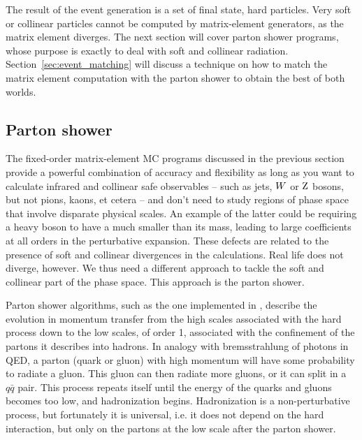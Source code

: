 The result of the event generation is a set of final state, hard particles. Very
soft or collinear particles cannot be computed by matrix-element generators, as the matrix element
diverges. The next section will cover parton shower programs, whose purpose is exactly to deal with
soft and collinear radiation. Section~\ref{sec:event_matching} will discuss a technique on how to
match the matrix element computation with the parton shower to obtain the best of both worlds. 



\subsection{Parton shower}

The fixed-order matrix-element MC programs discussed in the previous section provide a powerful
combination of accuracy and flexibility as long as you want to calculate infrared and collinear safe
observables -- such as jets, $W$ or $\mathrm{Z}$ bosons, but not pions, kaons, et cetera -- and
don’t need to study regions of phase space that involve disparate physical scales. An example of
the latter could be requiring a heavy boson to have a \pt much smaller than its mass, leading to
large coefficients at all orders in the perturbative expansion.
These defects are related to the presence of soft and collinear divergences in the calculations.
Real life does not diverge, however. We thus need a different approach to tackle the soft and
collinear part of the phase space. This approach is the parton shower. 

Parton shower algorithms, such as the one implemented in \PYTHIA, describe the evolution in
momentum transfer from the high scales associated with the hard process down to the low scales, of
order 1\GeV, associated with the confinement of the partons it describes into hadrons. 
In analogy with bremsstrahlung of photons in QED, a parton (quark or gluon) with high momentum will
have some probability to radiate a gluon. This gluon can then radiate more gluons, or it can split
in a $q\bar{q}$ pair. This process repeats itself until the energy of the quarks and gluons becomes
too low, and hadronization begins. Hadronization is a non-perturbative process, but fortunately it
is universal, i.e. it does not depend on the hard interaction, but only on the partons at the low
scale after the parton shower.

